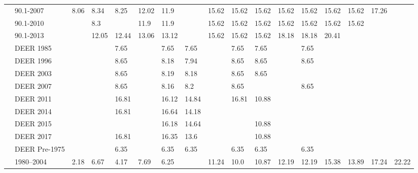 \begin{table}
\begin{tabular}{p{0.3in}p{0.5in}p{0.15in}p{0.15in}p{0.15in}p{0.15in}p{0.15in}p{0.15in}p{0.15in}p{0.15in}p{0.15in}p{0.15in}p{0.15in}p{0.15in}p{0.15in}p{0.15in}p{0.15in}}
           & 90.1-2007 &   8.06 &   8.34 &   8.25 &  12.02 &   11.9 &        &  15.62 &  15.62 &  15.62 &  15.62 &  15.62 &  15.62 &  15.62 &  17.26 &        \\
           & 90.1-2010 &        &    8.3 &        &   11.9 &   11.9 &        &  15.62 &  15.62 &  15.62 &  15.62 &  15.62 &  15.62 &  15.62 &        &        \\
           & 90.1-2013 &        &  12.05 &  12.44 &  13.06 &  13.12 &        &  15.62 &  15.62 &  15.62 &  18.18 &  18.18 &  20.41 &        &        &        \\
           & DEER 1985 &        &        &   7.65 &        &   7.65 &   7.65 &        &   7.65 &   7.65 &        &   7.65 &        &        &        &        \\
           & DEER 1996 &        &        &   8.65 &        &   8.18 &   7.94 &        &   8.65 &   8.65 &        &   8.65 &        &        &        &        \\
           & DEER 2003 &        &        &   8.65 &        &   8.19 &   8.18 &        &   8.65 &   8.65 &        &        &        &        &        &        \\
           & DEER 2007 &        &        &   8.65 &        &   8.16 &    8.2 &        &   8.65 &        &        &   8.65 &        &        &        &        \\
           & DEER 2011 &        &        &  16.81 &        &  16.12 &  14.84 &        &  16.81 &  10.88 &        &        &        &        &        &        \\
           & DEER 2014 &        &        &  16.81 &        &  16.64 &  14.18 &        &        &        &        &        &        &        &        &        \\
           & DEER 2015 &        &        &        &        &  16.18 &  14.64 &        &        &  10.88 &        &        &        &        &        &        \\
           & DEER 2017 &        &        &  16.81 &        &  16.35 &   13.6 &        &        &  10.88 &        &        &        &        &        &        \\
           & DEER Pre-1975 &        &        &   6.35 &        &   6.35 &   6.35 &        &   6.35 &   6.35 &        &   6.35 &        &        &        &        \\
           & 1980--2004 &   2.18 &   6.67 &   4.17 &   7.69 &   6.25 &        &  11.24 &   10.0 &  10.87 &  12.19 &  12.19 &  15.38 &  13.89 &  17.24 &  22.22 \\

\end{tabular}
\end{table}
